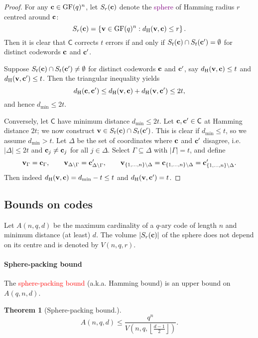 \documentclass[a4paper, 11pt, openany]{book}
\numberwithin{equation}{section}
\theoremstyle{plain}
\newtheorem{theorem}	[equation]	{Theorem}
\theoremstyle{definition}
\newcommand{\GF}{\mathrm{GF}}
\newcommand{\dH}{d_\mathrm{H}}
\newcommand{\dmin}{d_{\min}}
\newcommand{\Important}[1]{\textcolor{red}{#1}}
\newcommand{\Define}[1]{\textcolor{purple}{#1}}
\newcommand{\code}[1]{\mathsf{#1}}
\begin{document}
\begin{proof}
For any ${\bf c} \in \GF(q)^n$, let $S_r({\bf c})$ denote the \Define{sphere} of Hamming radius $r$ centred around ${\bf c}$:
\[
    S_r({\bf c}) = \left\{ {\bf v} \in \GF(q)^n : \dH({\bf v}, {\bf c}) \le r  \right\}.
\]
Then it is clear that $\code{C}$ corrects $t$ errors if and only if $S_t({\bf c}) \cap S_t({\bf c}') = \emptyset$ for distinct codewords ${\bf c}$ and ${\bf c}'$.

Suppose $S_t({\bf c}) \cap S_t({\bf c}') \ne \emptyset$ for distinct codewords ${\bf c}$ and ${\bf c}'$, say $\dH({\bf v}, {\bf c}) \le t$ and $\dH({\bf v}, {\bf c}') \le t$. Then the triangular inequality yields
\[
    \dH({\bf c}, {\bf c}') \le \dH({\bf v}, {\bf c}) + \dH({\bf v}, {\bf c}') \le 2t,
\]
and hence $\dmin \le 2t$.

Conversely, let $\code{C}$ have minimum distance $\dmin \le 2t$. Let ${\bf c}, {\bf c}' \in \code{C}$ at Hamming distance $2t$; we now construct ${\bf v} \in S_t({\bf c}) \cap S_t({\bf c}')$. This is clear if $\dmin \le t$, so we assume $\dmin > t$. Let $\Delta$ be the set of coordinates where ${\bf c}$ and ${\bf c}'$ disagree, i.e. $|\Delta| \le 2t$ and ${\bf c}_j \ne {\bf c}_j$ for all $j \in \Delta$. Select $\Gamma \subseteq \Delta$ with $|\Gamma| = t$, and define
\[
    {\bf v}_\Gamma = {\bf c}_\Gamma, \qquad
    {\bf v}_{\Delta \setminus \Gamma} = {\bf c}'_{\Delta \setminus \Gamma}, \qquad
    {\bf v}_{\{1, \dots, n\} \setminus \Delta} = {\bf c}_{\{1, \dots, n\} \setminus \Delta} = {\bf c}'_{\{1, \dots, n\} \setminus \Delta}.
\]
Then indeed $\dH({\bf v}, {\bf c}) = \dmin  - t \le t$ and $\dH({\bf v}, {\bf c}') = t$.
\end{proof}


\subsection{Bounds on codes}


Let $A(n,q,d)$ be the maximum cardinality of a $q$-ary code of length $n$ and minimum distance (at least) $d$. 
The volume $|S_r({\bf c})|$ of the sphere does not depend on its centre and is denoted by 
$V(n,q,r)$.

\paragraph{Sphere-packing bound}
The \Important{sphere-packing bound} (a.k.a. Hamming bound) is an upper bound on $A(q,n,d)$.


\begin{theorem}[Sphere-packing bound.]
\[
	A(n,q,d) \le \frac{ q^n }{ V \left( n,q, \left\lfloor \frac{d-1}{2} \right\rfloor \right) } .
\]
\end{theorem}
\end{document}
